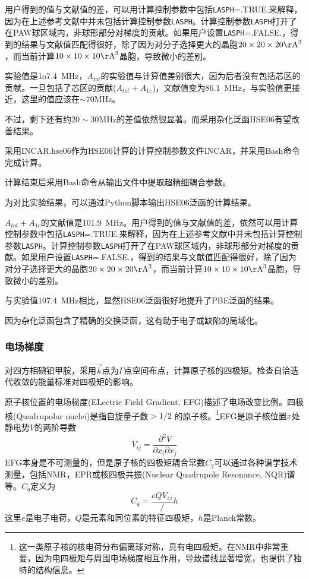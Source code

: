 用户得到的值与文献值的差，可以用计算控制参数中包括\texttt{LASPH}=\textrm{.TRUE.}来解释，因为在上述参考文献中并未包括计算控制参数\texttt{LASPH}。计算控制参数\texttt{LASPH}打开了在\textrm{PAW}球区域内，非球形部分对梯度的贡献。如果用户设置\texttt{LASPH}=\textrm{.FALSE.}，得到的结果与文献值匹配得很好，除了因为对分子选择更大的晶胞$20\times20\times20\mathrm{\AA}^3$，而当前计算$10\times10\times10\mathrm{\AA}^3$晶胞，导致微小的差别。

实验值是\textrm{1o7.4~MHz}，$A_{tot}$的实验值与计算值差别很大，因为后者没有包括芯区的贡献。一旦包括了芯区的贡献($A_{tot}+A_{1c}$)，文献值变为\textrm{86.1~MHz}，与实验值更接近，这里的值应该在$\sim70\mathrm{MHz}$。

不过，剩下还有约$20\sim30\mathrm{MHz}$的差值依然很显著。而采用杂化泛函\textrm{HSE06}有望改善结果。

采用\textrm{INCAR.hse06}作为\textrm{HSE06}计算的计算控制参数文件\textrm{INCAR}，并采用\textrm{Bash}命令完成计算。

计算结束后采用\textrm{Bash}命令从输出文件中提取超精细耦合参数。

为对比实验结果，可以通过\textrm{Python}脚本输出\textrm{HSE06}泛函的计算结果。

$A_{tot}+A_{1c}$的文献值是\textrm{101.9~MHz}。用户得到的值与文献值的差，依然可以用计算控制参数中包括\texttt{LASPH}=\textrm{.TRUE.}来解释，因为在上述参考文献中并未包括计算控制参数\texttt{LASPH}。计算控制参数\texttt{LASPH}打开了在\textrm{PAW}球区域内，非球形部分对梯度的贡献。如果用户设置\texttt{LASPH}=\textrm{.FALSE.}，得到的结果与文献值匹配得很好，除了因为对分子选择更大的晶胞$20\times20\times20\mathrm{\AA}^3$，而当前计算$10\times10\times10\mathrm{\AA}^3$晶胞，导致微小的差别。

与实验值\textrm{107.4~MHz}相比，显然\textrm{HSE06}泛函很好地提升了\textrm{PBE}泛函的结果。

因为杂化泛函包含了精确的交换泛函，这有助于电子或缺陷的局域化。

\subsubsection{电场梯度}
对四方相碘铅甲胺，采用$\vec k$点为$\Gamma$点空间布点，计算原子核的四极矩。检查自洽迭代收敛的能量标准对四极矩的影响。

原子核位置的电场梯度\textrm{(ELectric Field Gradient, EFG)}描述了电场改变比例。四极核\textrm{(Quadrupolar nuclei)}是指自旋量子数$>1/2$ 的原子核。\footnote{这一类原子核的核电荷分布偏离球对称，具有电四极矩。在\textrm{NMR}中非常重要，因为电四极矩与周围电场梯度相互作用，导致谱线显著增宽，也提供了独特的结构信息。}\textrm{EFG}是原子核位置$x$处静电势$V$的两阶导数
\begin{displaymath}
	V_{ij}=\dfrac{\partial^2V}{\partial x_i\partial x_j}
\end{displaymath}
\textrm{EFG}本身是不可测量的，但是原子核的四极矩耦合常数$C_q$可以通过各种谱学技术测量，包括\textrm{NMR}，\textrm{EPR}或核四极共振\textrm{(Nuclear Quadrupole Resonance, NQR)}谱等。$C_q$定义为
\begin{displaymath}
	C_q=\dfrac{eQV_{zz}}/h
\end{displaymath}
这里$e$是电子电荷，$Q$是元素和同位素的特征四极矩，$h$是\textrm{Planck}常数。

